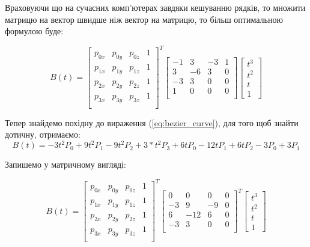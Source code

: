 \let\mypdfximage\pdfximage\def\pdfximage{\immediate\mypdfximage}\documentclass[14pt,a4paper]{extarticle}
\theoremstyle{definition}
\renewcommand{\[}{\begin{singlespace}\begin{equation*}}
\renewcommand{\]}{\end{equation*}\end{singlespace}}
\renewcommand{\+}{\discretionary{\mbox{\scriptsize$\hookleftarrow$}}{}{}}
\begin{document}
Враховуючи що на сучасних комп'ютерах завдяки кешуванню рядків, то множити матрицю на вектор швидше ніж вектор на матрицю, то більш оптимальною формулою буде: 
\[B(t)=\left[\begin{matrix}
p_{0x} & p_{0y} & p_{0z} & 1 \\
p_{1x} & p_{1y} & p_{1z} & 1 \\
p_{2x} & p_{2y} & p_{2z} & 1 \\
p_{3x} & p_{3y} & p_{3z} & 1 \\
\end{matrix}\right]^T\left[\begin{matrix}
-1 &  3 & -3 & 1 \\
 3 & -6 &  3 & 0 \\
-3 &  3 &  0 & 0 \\
 1 &  0 &  0 & 0 \\
\end{matrix}\right]\left[\begin{matrix}t^3\\t^2\\t\\1\end{matrix}\right]\]

Тепер знайдемо похідну до вираження (\ref{eq:bezier_curve}), для того щоб знайти дотичну, отримаємо:
\begin{equation}
B(t) = -3t^2P_0+9t^2P_1-9t^2P_2+3*t^2P_3 + 6tP_0-12tP_1+6tP_2 - 3P_0+3P_1
\end{equation}

Запишемо у матричному вигляді:
\[B(t)=\left[\begin{matrix}
p_{0x} & p_{0y} & p_{0z} & 1 \\
p_{1x} & p_{1y} & p_{1z} & 1 \\
p_{2x} & p_{2y} & p_{2z} & 1 \\
p_{3x} & p_{3y} & p_{3z} & 1 \\
\end{matrix}\right]^T\left[\begin{matrix}
 0 &   0 &  0 & 0 \\
-3 &   9 & -9 & 0 \\
 6 & -12 &  6 & 0 \\
-3 &   3 &  0 & 0 \\
\end{matrix}\right]^T\left[\begin{matrix}t^3\\t^2\\t\\1\end{matrix}\right]\]
\end{document}
